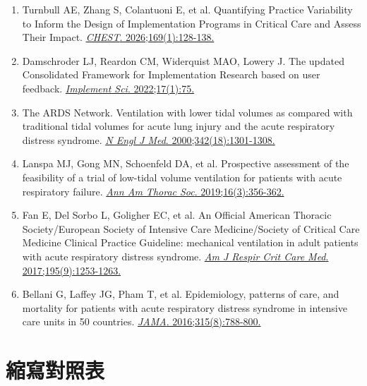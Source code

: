 \documentclass[12pt,a4paper]{article}
\begin{document}
\begin{enumerate}
    \item Turnbull AE, Zhang S, Colantuoni E, et al. Quantifying Practice Variability to Inform the Design of Implementation Programs in Critical Care and Assess Their Impact. \href{https://doi.org/10.1016/j.chest.2025.08.026}{\textit{CHEST}. 2026;169(1):128-138.}

    \item Damschroder LJ, Reardon CM, Widerquist MAO, Lowery J. The updated Consolidated Framework for Implementation Research based on user feedback. \href{https://doi.org/10.1186/s13012-022-01245-0}{\textit{Implement Sci}. 2022;17(1):75.}

    \item The ARDS Network. Ventilation with lower tidal volumes as compared with traditional tidal volumes for acute lung injury and the acute respiratory distress syndrome. \href{https://doi.org/10.1056/NEJM200005043421801}{\textit{N Engl J Med}. 2000;342(18):1301-1308.}

    \item Lanspa MJ, Gong MN, Schoenfeld DA, et al. Prospective assessment of the feasibility of a trial of low-tidal volume ventilation for patients with acute respiratory failure. \href{https://doi.org/10.1513/AnnalsATS.201809-627OC}{\textit{Ann Am Thorac Soc}. 2019;16(3):356-362.}

    \item Fan E, Del Sorbo L, Goligher EC, et al. An Official American Thoracic Society/European Society of Intensive Care Medicine/Society of Critical Care Medicine Clinical Practice Guideline: mechanical ventilation in adult patients with acute respiratory distress syndrome. \href{https://doi.org/10.1164/rccm.201703-0548ST}{\textit{Am J Respir Crit Care Med}. 2017;195(9):1253-1263.}

    \item Bellani G, Laffey JG, Pham T, et al. Epidemiology, patterns of care, and mortality for patients with acute respiratory distress syndrome in intensive care units in 50 countries. \href{https://doi.org/10.1001/jama.2016.0291}{\textit{JAMA}. 2016;315(8):788-800.}
\end{enumerate}

\section{縮寫對照表}
\end{document}

